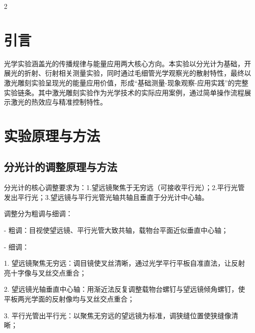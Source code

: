 \documentclass[12pt,a4paper]{article}
\begin{document}
\vspace{1cm}




\begin{multicols}{2}




    \section*{\heiti 引言}

    \songti

    \setlength{\parindent}{2em}

    光学实验涵盖光的传播规律与能量应用两大核心方向。本实验以分光计为基础，开展光的折射、衍射相关测量实验，同时通过毛细管光学观察光的散射特性，最终以激光雕刻实验呈现光的能量应用价值，形成“基础测量-现象观察-应用实践”的完整实验链条。其中激光雕刻实验作为光学技术的实际应用案例，通过简单操作流程展示激光的热效应与精准控制特性。



    \section{\heiti 实验原理与方法}

    \subsection{\heiti 分光计的调整原理与方法}

    \songti

    分光计的核心调整要求为：1.望远镜聚焦于无穷远（可接收平行光）；2.平行光管发出平行光；3.望远镜与平行光管光轴共轴且垂直于分光计中心轴。



    调整分为粗调与细调：

    - 粗调：目视使望远镜、平行光管大致共轴，载物台平面近似垂直中心轴；

    - 细调：

      1. 望远镜聚焦无穷远：调目镜使叉丝清晰，通过光学平行平板自准直法，让反射亮十字像与叉丝交点重合；

      2. 望远镜光轴垂直中心轴：用渐近法反复调整载物台螺钉与望远镜倾角螺钉，使平板两光学面的反射像均与叉丝交点重合；

      3. 平行光管出平行光：以聚焦无穷远的望远镜为标准，调狭缝位置使狭缝像清晰；


\end{multicols}
\end{document}

